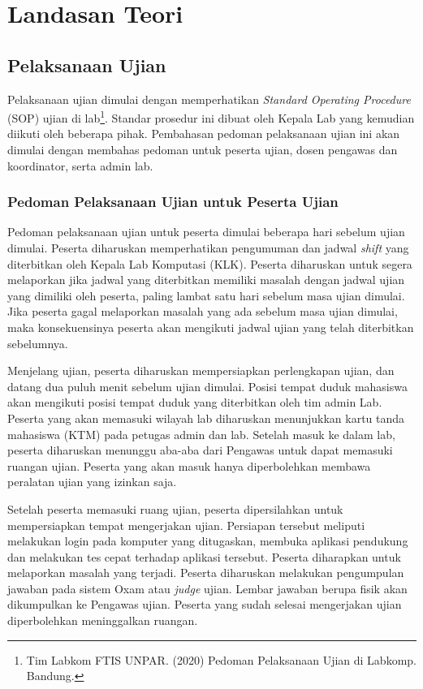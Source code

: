 \chapter{Landasan Teori}
\label{chap:teori}

\section{Pelaksanaan Ujian}
    Pelaksanaan ujian dimulai dengan memperhatikan \textit{Standard Operating
    Procedure} (SOP) ujian di lab\footnote{Tim Labkom FTIS UNPAR. (2020) Pedoman
    Pelaksanaan Ujian di Labkomp. Bandung.}. Standar prosedur ini dibuat oleh Kepala Lab
    yang kemudian diikuti oleh beberapa pihak. Pembahasan pedoman pelaksanaan
    ujian ini akan dimulai dengan membahas pedoman untuk peserta ujian,
    dosen pengawas dan koordinator, serta admin lab.
    
\subsection{Pedoman Pelaksanaan Ujian untuk Peserta Ujian}
    Pedoman pelaksanaan ujian untuk peserta dimulai beberapa hari sebelum ujian
    dimulai. Peserta diharuskan memperhatikan pengumuman dan jadwal
    \textit{shift} yang diterbitkan oleh Kepala Lab Komputasi (KLK). Peserta
    diharuskan untuk segera melaporkan jika jadwal yang diterbitkan memiliki
    masalah dengan jadwal ujian yang dimiliki oleh peserta, paling lambat satu
    hari sebelum masa ujian dimulai. Jika peserta gagal melaporkan masalah yang
    ada sebelum masa ujian dimulai, maka konsekuensinya peserta akan mengikuti
    jadwal ujian yang telah diterbitkan sebelumnya.

    Menjelang ujian, peserta diharuskan mempersiapkan perlengkapan ujian, dan
    datang dua puluh menit sebelum ujian dimulai. Posisi tempat duduk mahasiswa
    akan mengikuti posisi tempat duduk yang diterbitkan oleh tim admin Lab.
    Peserta yang akan memasuki wilayah lab diharuskan menunjukkan kartu tanda
    mahasiswa (KTM) pada petugas admin dan lab. Setelah masuk ke dalam lab,
    peserta diharuskan menunggu aba-aba dari Pengawas untuk dapat memasuki
    ruangan ujian. Peserta yang akan masuk hanya diperbolehkan membawa peralatan
    ujian yang izinkan saja.

    Setelah peserta memasuki ruang ujian, peserta dipersilahkan untuk mempersiapkan
    tempat mengerjakan ujian. Persiapan tersebut meliputi melakukan login pada
    komputer yang ditugaskan, membuka aplikasi pendukung dan melakukan tes
    cepat terhadap aplikasi tersebut. Peserta diharapkan untuk melaporkan
    masalah yang terjadi. Peserta diharuskan melakukan pengumpulan jawaban pada
    sistem Oxam atau \textit{judge} ujian. Lembar jawaban berupa fisik akan
    dikumpulkan ke Pengawas ujian. Peserta yang sudah selesai mengerjakan ujian
    diperbolehkan meninggalkan ruangan.

